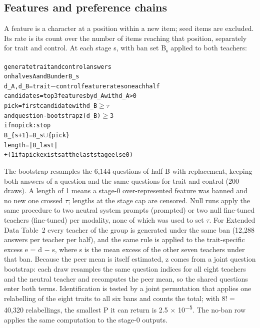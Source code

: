 \subsection{Features and preference chains}
A feature is a character at a position within a new item; seed items are excluded. Its rate is its count over the number of items reaching that position, separately for trait and control. At each stage s, with ban set B\textsubscript{s} applied to both teachers:


\begin{alltt}\fontsize{7.2bp}{8.8bp}\selectfont
generate trait and control answers
    on halves A and B under B_s
d_A, d_B = trait \(-\) control feature rates on each half
candidates = top 3 features by d_A with d_A > 0
pick = first candidate with d_B \(\geq\) \(\tau\)
       and question-bootstrap z(d_B) \(\geq\) 3
if no pick: stop
B_\{s+1\} = B_s \(\cup\) \{pick\}
length = |B_last|
         + (1 if a pick exists at the last stage else 0)
\end{alltt}


The bootstrap resamples the 6,144 questions of half B with replacement, keeping both answers of a question and the same questions for trait and control (200 draws). A length of 1 means a stage-0 over-represented feature was banned and no new one crossed $\tau$; lengths at the stage cap are censored. Null runs apply the same procedure to two neutral system prompts (prompted) or two null fine-tuned teachers (fine-tuned) per modality, none of which was used to set $\tau$. For Extended Data Table~2 every teacher of the group is generated under the same ban (12,288 answers per teacher per half), and the same rule is applied to the trait-specific excess e = d $-$ s, where s is the mean excess of the other seven teachers under that ban. Because the peer mean is itself estimated, z comes from a joint question bootstrap: each draw resamples the same question indices for all eight teachers and the neutral teacher and recomputes the peer mean, so the shared questions enter both terms. Identification is tested by a joint permutation that applies one relabelling of the eight traits to all six bans and counts the total; with 8! = 40,320 relabellings, the smallest P it can return is 2.5 $\times$ 10\textsuperscript{$-$5}. The no-ban row applies the same computation to the stage-0 outputs.


